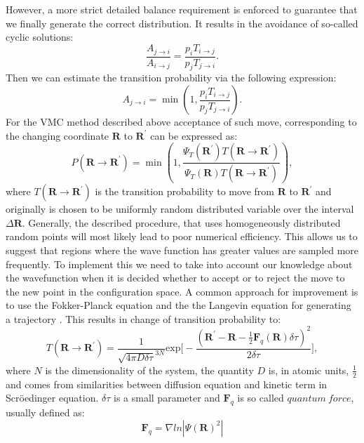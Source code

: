 \documentclass[twoside,english]{uiofysmaster}
\begin{document}
However, a more strict detailed balance requirement is enforced to
guarantee that we finally generate the correct distribution. It
results in the avoidance of so-called cyclic
solutions\cite{Hjorth-Jensenadvancedcoursecomputational2017}:
\begin{equation}
\frac{ A_{j\rightarrow i}}{A_{i\rightarrow j}}
= \frac{p_iT_{i\rightarrow j}}{ p_jT_{j\rightarrow i}}.
\end{equation}
Then we can estimate the transition probability via the following expression: 
\begin{equation}
A_{j \rightarrow i} = \min \left ( 1,
\frac{p_iT_{i\rightarrow j}}{ p_jT_{j\rightarrow i}}\right ).
\end{equation}
For the VMC method described above acceptance of such move,
corresponding to the changing coordinate $\boldsymbol{R}$ to
$\boldsymbol{R}^\prime$ can be expressed as:
\begin{equation}
P({\boldsymbol{R} \rightarrow \boldsymbol{R}^\prime}) = \min \left ( 1,
\frac{\Psi_T(\boldsymbol{R}^\prime)T(\boldsymbol{R} \rightarrow \boldsymbol{R}^\prime)}{ \Psi_T(\boldsymbol{R})T(\boldsymbol{R} \rightarrow \boldsymbol{R}^\prime)}\right ),
\end{equation}
where $T(\boldsymbol{R} \rightarrow \boldsymbol{R}^\prime)$ is the
transition probability to move from $\boldsymbol{R}$ to
$\boldsymbol{R}^\prime$ and originally is chosen to be uniformly
random distributed variable over the interval $\Delta
\boldsymbol{R}$. Generally, the described procedure, that uses
homogeneously distributed random points will most likely lead to poor
numerical efficiency. This allows us to suggest that regions where the
wave function has greater values are sampled more frequently. To
implement this we need to take into account our knowledge about the
wavefunction when it is decided whether to accept or to reject the
move to the new point in the configuration space. A common approach
for improvement is to use the Fokker-Planck equation and the the
Langevin equation for generating a trajectory
\cite{VanKampenStochasticProcessesPhysics2007}. This results in change
of transition probability to:
\begin{equation}
T(\boldsymbol{R} \rightarrow \boldsymbol{R}^\prime) = \frac{1}{\sqrt{4\pi D\delta\tau}^{3N}} \text{exp}\Bigg[-\frac{(\boldsymbol{R}^\prime - \boldsymbol{R} -\frac{1}{2}\boldsymbol{F}_q(\boldsymbol{R})\delta \tau)^2}{2\delta \tau}\Bigg],
\end{equation}
where $N$ is the dimensionality of the system, the quantity $D$ is, in atomic units, $\frac{1}{2}$ and comes from similarities between diffusion equation and kinetic term in Scr\"{o}edinger equation. $\delta \tau$ is a small parameter and $\boldsymbol{F}_q$ is so called $quantum\ force$, usually defined as:
\begin{equation}
\boldsymbol{F}_q = \nabla ln|\Psi(\boldsymbol{R})^2|
\end{equation}
\end{document}
